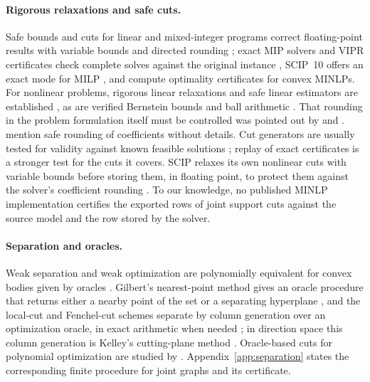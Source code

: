 \paragraph{Rigorous relaxations and safe cuts.}
Safe bounds and cuts for linear and mixed-integer programs correct
floating-point results with variable bounds and directed rounding
\citep{NeumaierShcherbina2004,CookEtAl2009SafeCuts,EiflerGleixner2024}; exact
MIP solvers and VIPR certificates check complete solves against the original
instance \citep{CookKochSteffyWolter2013,CheungGleixnerSteffy2017,EiflerGleixner2023},
SCIP~10 offers an exact mode for MILP \citep{SCIP10}, and
\citet{HalbigEtAl2024} compute optimality certificates for convex MINLPs. For nonlinear
problems, rigorous linear relaxations and safe linear estimators are
established \citep{BorradaileVanHentenryck2005,Kearfott2011,DomesNeumaier2012,NininMessineHansen2015},
as are verified Bernstein bounds
\citep{GarloffJanssonSmith2003JCAM,GarloffSmith2008,MunozNarkawicz2013} and
ball arithmetic \citep{Johansson2017arb}. That rounding in the problem
formulation itself must be controlled was pointed out by
\citet[Section~20]{Neumaier2004} and \citet{SchichlNeumaier2005}.
\citet{LiersEtAl2021} mention safe rounding of coefficients without details.
Cut generators are usually tested for validity against known feasible
solutions \citep{Margot2009}; replay of exact certificates is a stronger test
for the cuts it covers. SCIP relaxes its own nonlinear cuts with variable
bounds before storing them, in floating point, to protect them against the
solver's coefficient rounding \citep[Section~4.2.10]{SCIP8report}. To our
knowledge, no published MINLP implementation certifies the exported rows of
joint support cuts against the source model and the row stored by the solver.

\paragraph{Separation and oracles.}
Weak separation and weak optimization are polynomially equivalent for convex
bodies given by oracles \citep{GrotschelLovaszSchrijver1981,GrotschelLovaszSchrijver1988}.
Gilbert's nearest-point method gives an oracle procedure that returns either
a nearby point of the set or a separating hyperplane
\citep{Gilbert1966,BrierleyNavascuesVertesi2016}, and the local-cut and
Fenchel-cut schemes separate by column generation over an optimization
oracle, in exact arithmetic when needed \citep{Boyd1994,ChvatalCookEspinoza2013};
in direction space this column generation is Kelley's cutting-plane method
\citep{CheneyGoldstein1959,Kelley1960}. Oracle-based cuts for polynomial
optimization are studied by \citet{BienstockChenMunoz2020}.
Appendix~\ref{app:separation} states the corresponding finite procedure for
joint graphs and its certificate.

